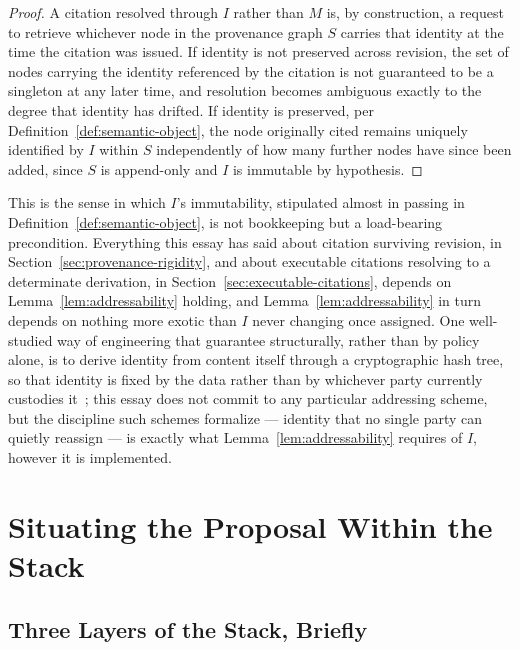 \documentclass[11pt]{article}
\theoremstyle{definition}
\begin{document}
\begin{proof}
A citation resolved through $I$ rather than $M$ is, by construction, a request to retrieve whichever node in the provenance graph $S$ carries that identity at the time the citation was issued. If identity is not preserved across revision, the set of nodes carrying the identity referenced by the citation is not guaranteed to be a singleton at any later time, and resolution becomes ambiguous exactly to the degree that identity has drifted. If identity is preserved, per Definition~\ref{def:semantic-object}, the node originally cited remains uniquely identified by $I$ within $S$ independently of how many further nodes have since been added, since $S$ is append-only and $I$ is immutable by hypothesis.
\end{proof}

This is the sense in which $I$'s immutability, stipulated almost in passing in Definition~\ref{def:semantic-object}, is not bookkeeping but a load-bearing precondition. Everything this essay has said about citation surviving revision, in Section~\ref{sec:provenance-rigidity}, and about executable citations resolving to a determinate derivation, in Section~\ref{sec:executable-citations}, depends on Lemma~\ref{lem:addressability} holding, and Lemma~\ref{lem:addressability} in turn depends on nothing more exotic than $I$ never changing once assigned. One well-studied way of engineering that guarantee structurally, rather than by policy alone, is to derive identity from content itself through a cryptographic hash tree, so that identity is fixed by the data rather than by whichever party currently custodies it~\cite{merkle1987}; this essay does not commit to any particular addressing scheme, but the discipline such schemes formalize --- identity that no single party can quietly reassign --- is exactly what Lemma~\ref{lem:addressability} requires of $I$, however it is implemented.

\section{Situating the Proposal Within the Stack}
\label{sec:situating}

\subsection{Three Layers of the Stack, Briefly}
\end{document}
